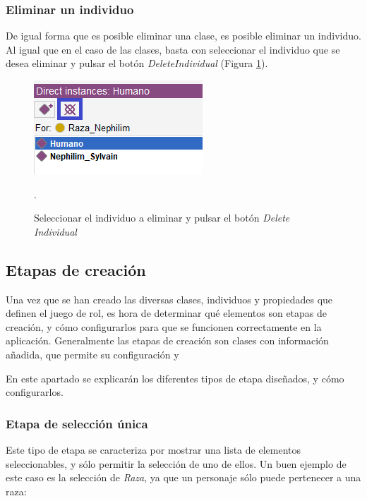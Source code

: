 \subsubsection{Eliminar un individuo}
De igual forma que es posible eliminar una clase, es posible eliminar un individuo. Al igual que en el caso de las clases, 
basta con seleccionar el individuo que se desea eliminar y pulsar el botón \textit{DeleteIndividual} (Figura \ref*{DeleteIndividual}).

\begin{figure}[H]
    \centering
    \includegraphics[scale=0.6]{Figures/Protege/DeleteIndividual.png}
    \caption{Seleccionar el individuo a eliminar y pulsar el botón \textit{Delete Individual}}.
    \label{DeleteIndividual}
\end{figure}

\subsection{Etapas de creación}
Una vez que se han creado las diversas clases, individuos y propiedades que definen el juego de rol, es hora de 
determinar qué elementos son etapas de creación, y cómo configurarlos para que se funcionen correctamente en la aplicación.
Generalmente las etapas de creación son clases con información añadida, que permite su configuración y  

En este apartado se explicarán los diferentes tipos de etapa diseñados, y cómo configurarlos.

\subsubsection{Etapa de selección única}
Este tipo de etapa se caracteriza por mostrar una lista de elementos seleccionables, y sólo permitir la selección de uno de ellos.
Un buen ejemplo de este caso es la selección de \textit{Raza}, ya que un personaje sólo puede pertenecer a una raza:

